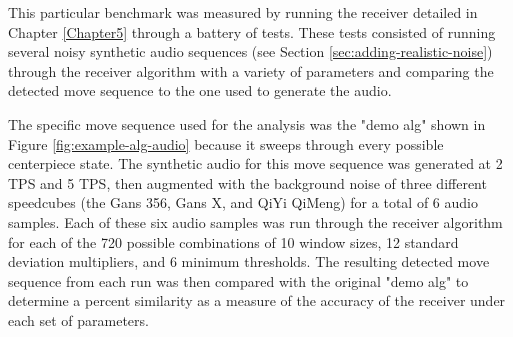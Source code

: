 This particular benchmark was measured by running the receiver detailed
in Chapter \ref{Chapter5} through a battery of tests. These tests
consisted of running several noisy synthetic audio sequences (see
Section \ref{sec:adding-realistic-noise}) through the receiver algorithm
with a variety of parameters and comparing the detected move sequence
to the one used to generate the audio.

The specific move sequence used for the analysis was the "demo alg"
shown in Figure \ref{fig:example-alg-audio} because it sweeps through
every possible centerpiece state. The synthetic audio for this move
sequence was generated at 2 TPS and 5 TPS, then augmented with the
background noise of three different speedcubes (the Gans 356, Gans X,
and QiYi QiMeng) for a total of 6 audio samples. Each of these six
audio samples was run through the receiver algorithm for each of the
720 possible combinations of 10 window sizes, 12 standard deviation
multipliers, and 6 minimum thresholds. The resulting detected move
sequence from each run was then compared with the original "demo alg"
to determine a percent similarity as a measure of the accuracy of the
receiver under each set of parameters.

\newpage
